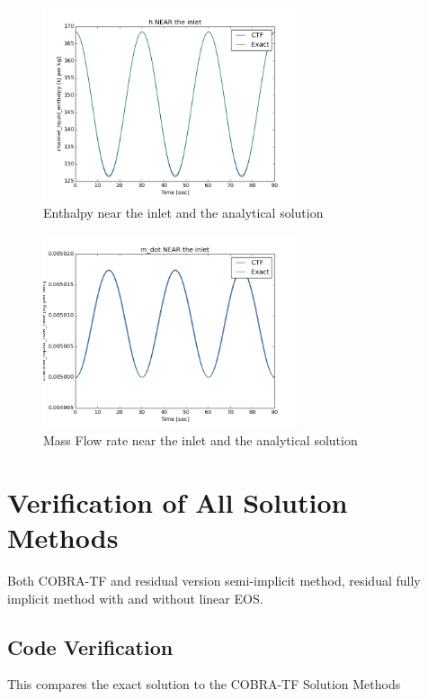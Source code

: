 \documentclass{mc2015}
\begin{document}
\begin{figure}[!h]
	\centering
	\includegraphics[width=0.675\textwidth]{images/Inlet_h}
	\caption{Enthalpy near the inlet and the analytical solution}
	\label{fig:Inlet_h}
\end{figure}

\begin{figure}[!h]
	\centering
	\includegraphics[width=0.675\textwidth]{images/Inlet_m_dot}
	\caption{Mass Flow rate near the inlet and the analytical solution}
	\label{fig:Inlet_m_dot}
\end{figure}

\section{Verification of All Solution Methods}

Both COBRA-TF and residual version semi-implicit method, residual fully implicit
method with and without linear EOS.

\subsection{Code Verification}

This compares the exact solution to the COBRA-TF Solution Methods
\end{document}
